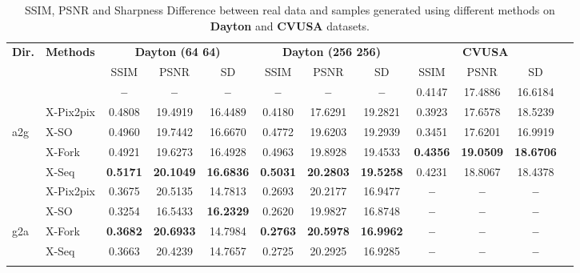 \documentclass[times,twocolumn,final,authoryear]{elsarticle_modified}
\begin{document}
\begin{table*}[htbp]
 \small
   \renewcommand{\arraystretch}{.8}
  \centering
\caption{\small SSIM, PSNR and Sharpness Difference between real data and samples generated using different methods on \textbf{Dayton} and \textbf{CVUSA} datasets.}
  \vspace{-10pt}
  \label{tab:ssim_psnr_sd}
  
    \begin{tabular*}{\textwidth}{l @{\extracolsep{\fill}} lcccccccccc}
        \toprule
             \multicolumn{1}{l}{\textbf{Dir.}} &   \multicolumn{1}{l}{\textbf{Methods}} & \multicolumn{3}{c}{\textbf{Dayton (64  64)}} & \multicolumn{3}{c}{\textbf{Dayton (256 256)}} & \multicolumn{3}{c}{\textbf{CVUSA}}     \\
                \cmidrule(lr){3-5}
\cmidrule(lr){6-8} \cmidrule(lr){9-11}
         &  & SSIM  & PSNR  & SD  & SSIM  & PSNR & SD & SSIM & PSNR & SD \\
        \midrule
   &  \cite{zhai2017crossview} & \textbf{--} & \textbf{--} & \textbf{--} & \textbf{--} & \textbf{--} & \textbf{--}  & 0.4147 & 17.4886 & 16.6184 \\
    & X-Pix2pix  & 0.4808 & 19.4919 & 16.4489 & 0.4180 & 17.6291 & 19.2821  & 0.3923 & 17.6578 & 18.5239 \\
     a2g &  X-SO & 0.4960 & 19.7442 & 16.6670 & 0.4772 & 19.6203 & 19.2939 & {0.3451} & {17.6201} & {16.9919} \\

   & X-Fork & 0.4921 & 19.6273 & 16.4928 & 0.4963 & 19.8928 & 19.4533  & \textbf{0.4356} & \textbf{19.0509} & \textbf{18.6706}\\
   & X-Seq & \textbf{0.5171} & \textbf{20.1049} & \textbf{16.6836} & \textbf{0.5031} & \textbf{20.2803} & \textbf{19.5258}  & 0.4231 & 18.8067 & 18.4378 \\
    \midrule
  &  X-Pix2pix & 0.3675 & 20.5135 & {14.7813} & 0.2693 & 20.2177 & 16.9477 & \textbf{--} & \textbf{--} & \textbf{--} \\
  &  X-SO & 0.3254 & 16.5433 & \textbf{16.2329} & 0.2620 & 19.9827 & 16.8748 & \textbf{--} & \textbf{--} & \textbf{--} \\
  g2a &  X-Fork & \textbf{0.3682} & \textbf{20.6933} & {14.7984} & \textbf{0.2763} & \textbf{20.5978} & \textbf{16.9962}  &  \textbf{--} & \textbf{--} & \textbf{--}\\
 &   X-Seq & {0.3663} & {20.4239} & {14.7657} & {0.2725} & {20.2925} & {16.9285}  & \textbf{--} & \textbf{--} & \textbf{--} \\
        \bottomrule
         \vspace{-10pt}
    \end{tabular*}
\end{table*}  
\end{document}
